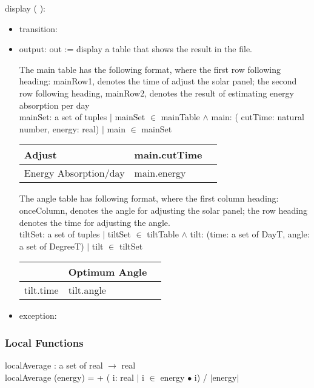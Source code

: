 \documentclass[12pt, titlepage]{article}
\begin{document}
\noindent  display ( ):
\begin{itemize}
\item transition:
\item output: out := display a table that shows the result in the file.

The main table has the following format, where the first row following heading: mainRow1, denotes the time of adjust the solar panel; the second row following heading, mainRow2, denotes the result of estimating energy absorption per day\\

mainSet: a set of tuples $|$ mainSet $\in$ mainTable $\wedge$ main: ( 
cutTime: natural number, energy: real) $|$ main $\in$ mainSet\\


\begin{center}
\begin{tabular}{|p{4.5cm}|p{4cm}|p{1cm}|}

\hline 
Adjust & main.cutTime   \\
\hline 
Energy Absorption/day & main.energy    \\
\hline 
\end{tabular}
\end{center}

The angle table has following format,  where the  first column heading: onceColumn, denotes the angle for adjusting the solar panel; the row heading denotes the time for adjusting the angle.\\


tiltSet: a set of tuples $|$ tiltSet $\in$ tiltTable $\wedge$ tilt: (time: a set of DayT,  angle: a set of DegreeT)  $|$ tilt $\in$ tiltSet \ \\

\begin{center}
\begin{tabular}{|p{4.5cm}|p{4cm}|p{1cm}|}

\hline 
  & Optimum Angle   \\
\hline 
tilt.time & tilt.angle \\
\hline 
\end{tabular}
\end{center}


\item exception: 
\end{itemize}


\subsubsection{Local Functions}
localAverage : a set of real $\rightarrow$ real\\
localAverage (energy) =  + ( i: real $|$ i $\in$ energy $\bullet$  i) / $|$energy$|$\\
\end{document}

